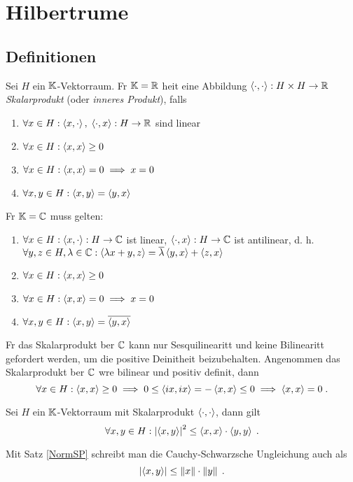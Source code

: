 \chapter{Hilbertr\as ume}
\section{Definitionen}
\begin{definition}
	Sei $H$ ein \(\mathbb{K}\)-Vektorraum. F\us r \(\mathbb{K} = \mathbb{R}\) hei\s t eine Abbildung \(\left\langle\cdot,\cdot\right\rangle: H \times H \to \mathbb{R}\) \textit{Skalarprodukt} (oder \textit{inneres Produkt}), falls
	\begin{enumerate}[noitemsep]
		\item \(\forall x \in H: \left\langle x, \cdot\right\rangle,\; \left\langle\cdot, x\right\rangle : H \to \mathbb{R}\) sind linear
		\item \(\forall x \in H: \left\langle x,x\right\rangle  \geq 0\)
		\item \(\forall x \in H: \left\langle x,x\right\rangle = 0 \implies x = 0\)
		\item \(\forall x, y \in H: \left\langle x,y\right\rangle = \left\langle y,x\right\rangle\)
	\end{enumerate}
	F\us r \(\mathbb{K} = \mathbb{C}\) muss gelten:
	\begin{enumerate}[noitemsep]
		\item \(\forall x \in H: \left\langle x, \cdot\right\rangle: H \to \mathbb{C}\) ist linear, \(\left\langle\cdot,x\right\rangle: H \to \mathbb{C}\) ist antilinear, d. h. 
		\(\forall y, z \in H, \lambda \in \mathbb{C}: \left\langle\lambda x + y, z\right\rangle = \overline \lambda \left\langle y,x\right\rangle + \left\langle z,x\right\rangle\)
		\item \(\forall x \in H: \left\langle x,x\right\rangle  \geq 0\)
		\item \(\forall x \in H: \left\langle x,x\right\rangle = 0 \implies x = 0\)
		\item \(\forall x, y \in H: \left\langle x,y\right\rangle = \overline{\left\langle y,x\right\rangle}\)
	\end{enumerate}
\end{definition}

\begin{rem}
	F\us r das Skalarprodukt \us ber $\mathbb{C}$ kann nur Sesquilinearit\as t und keine Bilinearit\as t gefordert werden, um die positive Deinitheit beizubehalten. Angenommen das Skalarprodukt \us ber $\mathbb{C}$ w\as re bilinear und positiv definit, dann 
	\[\forall x \in H: \left\langle x,x\right\rangle \geq 0 \implies 0 \leq \left\langle ix, ix\right\rangle = - \left\langle x,x\right\rangle \leq 0 \implies \left\langle x,x\right\rangle = 0 \;.\]
\end{rem}

\begin{theorem}
	Sei $H$ ein \(\mathbb{K}\)-Vektorraum mit Skalarprodukt \(\left\langle\cdot, \cdot\right\rangle\), dann gilt
	\[\forall x, y \in H: \left\lvert \left\langle x,y\right\rangle \right\rvert^2 \leq \left\langle x,x\right\rangle \cdot \left\langle y,y\right\rangle\;.\]
	\label{CauchySchwarz}
\end{theorem}
\begin{rem}
	Mit Satz \ref{NormSP} schreibt man die Cauchy-Schwarzsche Ungleichung auch als 
	\[\left\lvert \left\langle x,y\right\rangle \right\rvert \leq \left\lVert x\right\rVert \cdot \left\lVert y\right\rVert\;.\]
\end{rem}

